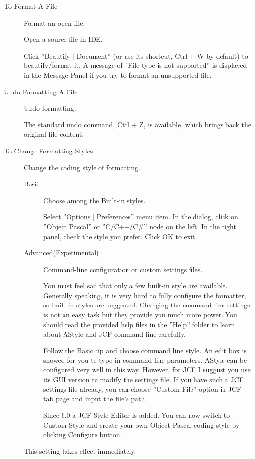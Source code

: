 \begin{description}

\item[To Format A File] Format an open file.


Open a source file in IDE.

Click ''Beautify $|$ Document'' (or use its shortcut, Ctrl + W by default) to
beautify/format it. A message of ''File type is not supported'' is displayed in the
Message Panel if you try to format an unsupported file.

\item[Undo Formatting A File] Undo formatting.

The standard undo command, Ctrl + Z, is available, which brings back the
original file content.

\item[To Change Formatting Styles] Change the coding style of formatting.

\begin{description}

\item [Basic] Choose among the Built-in styles.

Select ''Options $|$ Preferences'' menu item. In the dialog, click on ''Object
Pascal'' or ''C/C++/C\#'' node on the left. In the right
 panel, check the style you prefer. Click OK to exit.





\item[Advanced(Experimental)] Command-line configuration or custom settings files.

You must feel sad that only a few built-in style
are available. Generally
speaking, it is very hard to fully configure the formatter, so built-in styles
are suggested. Changing the command line settings is not an easy task but they
provide you much more power. You should read the provided help files in the
''Help'' folder to learn about AStyle and JCF command line carefully.

Follow the Basic tip and choose command line style. An edit box is showed for
you to type in command line parameters. AStyle can be configured very well in
this way. However, for JCF I suggust you use its GUI version to modify the
settings file. If you have such a JCF settings file already, you can choose
''Custom File'' option in JCF tab page and input the file's path.

Since 6.0 a JCF Style Editor is added. You can now switch to Custom Style and
create your own Object Pascal coding style by clicking Configure button.
\end{description}

This setting takes effect immediately.

\end{description}


